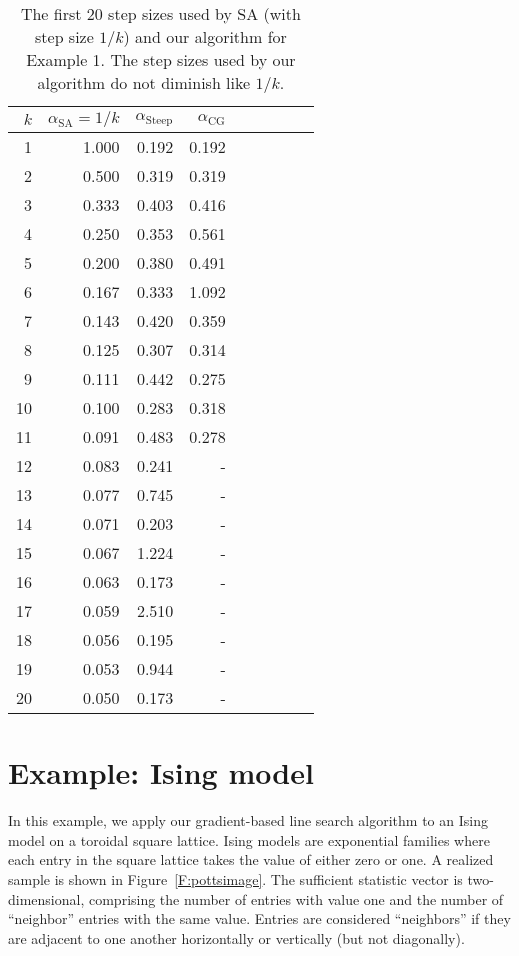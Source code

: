 \documentclass[oneside]{myumnStatThesis}
\begin{document}
\begin{table}
\caption{The first 20 step sizes used by  SA (with step size $1/k$) and our algorithm for Example 1.  The step sizes 
used by our algorithm do not diminish like $1/k$.
}
\begin{center}
\begin{tabular}{rrrrrrrrr}
  \hline
  $k$ & $\alpha_{\textrm{SA}} = 1/k$  & $\alpha_{\textrm{Steep}}$ & $\alpha_{\textrm{CG}}$ \\ 
  \hline
1	&	1.000	&	0.192	&	0.192	\\
2	&	0.500	&	0.319	&	0.319	\\
3	&	0.333	&	0.403	&	0.416	\\
4	&	0.250	&	0.353	&	0.561	\\
5	&	0.200	&	0.380	&	0.491	\\
6	&	0.167	&	0.333	&	1.092	\\
7	&	0.143	&	0.420	&	0.359	\\
8	&	0.125	&	0.307	&	0.314	\\
9	&	0.111	&	0.442	&	0.275	\\
10	&	0.100	&	0.283	&	0.318	\\
11	&	0.091	&	0.483	&	0.278	\\
12	&	0.083	&	0.241	&	-	\\
13	&	0.077	&	0.745	&	-	\\
14	&	0.071	&	0.203	&	-	\\
15	&	0.067	&	1.224	&	-	\\
16	&	0.063	&	0.173	&	-	\\
17	&	0.059	&	2.510	&	-	\\
18	&	0.056	&	0.195	&	-	\\
19	&	0.053	&	0.944	&	-	\\
20	&	0.050	&	0.173	&	-	\\
  \hline
\end{tabular}
\end{center}
\label{Table:step size}
\end{table}



\section{Example: Ising model} \label{S:Examples:Ising}
In this example, we apply our gradient-based line search algorithm to an Ising model \citep{Ising} on a toroidal square 
lattice.  Ising models are exponential families where each entry in the square lattice takes the value of either zero 
or one.  A realized sample is shown in Figure~\ref{F:pottsimage}.  The sufficient statistic vector is two-dimensional, 
comprising the number of entries with value one and the number of ``neighbor'' entries with the same value.  Entries are 
considered ``neighbors'' if they are adjacent to one another horizontally or vertically (but not diagonally).  
\end{document}
